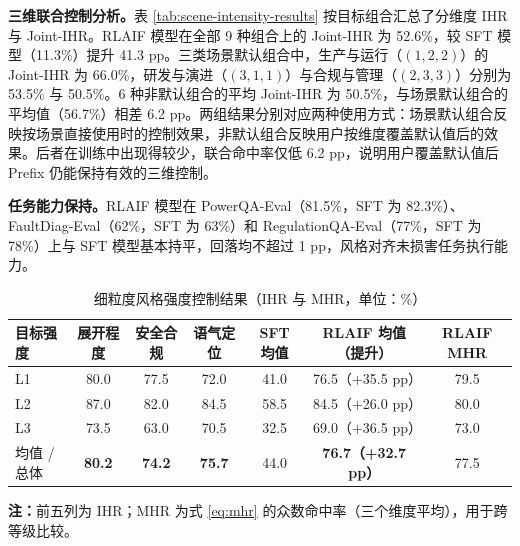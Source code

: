 \documentclass[fontset=fandol,type=master,campus=shenzhen,etitleauto=true]{hithesisbook}
\begin{document}
\textbf{三维联合控制分析。}表 \ref{tab:scene-intensity-results} 按目标组合汇总了分维度 IHR 与 Joint-IHR。RLAIF 模型在全部 9 种组合上的 Joint-IHR 为 52.6\%，较 SFT 模型（11.3\%）提升 41.3 pp。三类场景默认组合中，生产与运行（$(1,2,2)$）的 Joint-IHR 为 66.0\%，研发与演进（$(3,1,1)$）与合规与管理（$(2,3,3)$）分别为 53.5\% 与 50.5\%。6 种非默认组合的平均 Joint-IHR 为 50.5\%，与场景默认组合的平均值（56.7\%）相差 6.2 pp。两组结果分别对应两种使用方式：场景默认组合反映按场景直接使用时的控制效果，非默认组合反映用户按维度覆盖默认值后的效果。后者在训练中出现得较少，联合命中率仅低 6.2 pp，说明用户覆盖默认值后 Prefix 仍能保持有效的三维控制。

\textbf{任务能力保持。}RLAIF 模型在 PowerQA-Eval（81.5\%，SFT 为 82.3\%）、FaultDiag-Eval（62\%，SFT 为 63\%）和 RegulationQA-Eval（77\%，SFT 为 78\%）上与 SFT 模型基本持平，回落均不超过 1 pp，风格对齐未损害任务执行能力。

\begin{table}[htbp]
\centering
\caption{细粒度风格强度控制结果（IHR 与 MHR，单位：\%）}
\label{tab:intensity-results}
\small
\setlength{\tabcolsep}{3pt}
\renewcommand{\arraystretch}{1.15}
\begin{tabular}{l c c c c c c}
\toprule
\textbf{目标强度} & \textbf{展开程度} & \textbf{安全合规} & \textbf{语气定位} & \textbf{SFT 均值} & \textbf{RLAIF 均值（提升）} & \textbf{RLAIF MHR} \\
\midrule
L1 & 80.0 & 77.5 & 72.0 & 41.0 & 76.5（+35.5 pp） & 79.5 \\
L2 & 87.0 & 82.0 & 84.5 & 58.5 & 84.5（+26.0 pp） & 80.0 \\
L3 & 73.5 & 63.0 & 70.5 & 32.5 & 69.0（+36.5 pp） & 73.0 \\
\midrule
均值 / 总体 & \textbf{80.2} & \textbf{74.2} & \textbf{75.7} & 44.0 & \textbf{76.7（+32.7 pp）} & 77.5 \\
\bottomrule
\end{tabular}

\vspace{0.2cm}
{\small \textbf{注：}前五列为 IHR；MHR 为式 \eqref{eq:mhr} 的众数命中率（三个维度平均），用于跨等级比较。}
\end{table}
\end{document}
